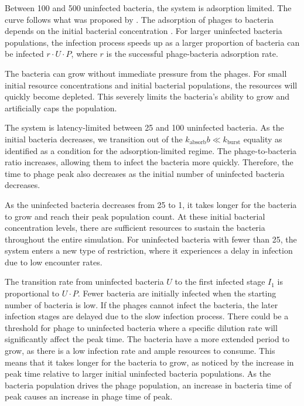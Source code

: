 Between 100 and 500 uninfected bacteria, the system is adsorption limited.
The curve follows what was proposed by \citet{mullaExtremeDiversityPhage2024}. 
The adsorption of phages to bacteria depends on the initial bacterial concentration \cite{mullaExtremeDiversityPhage2024}. 
For larger uninfected bacteria populations, the infection process speeds up as a larger proportion of bacteria can be infected $r\cdot U\cdot P$, where $r$ is the successful phage-bacteria adsorption rate. 

The bacteria can grow without immediate pressure from the phages. 
For small initial resource concentrations and initial bacterial populations, the resources will quickly become depleted. 
This severely limits the bacteria’s ability to grow and artificially caps the population. 

The system is latency-limited between 25 and 100 uninfected bacteria. 
As the initial bacteria decreases, we transition out of the $k_{\text{absorb}}b \ll k_{\text{burst}}$ equality as identified as a condition for the adsorption-limited regime. 
The phage-to-bacteria ratio increases, allowing them to infect the bacteria more quickly. 
Therefore, the time to phage peak also decreases as the initial number of uninfected bacteria decreases. 

As the uninfected bacteria decreases from 25 to 1, it takes longer for the bacteria to grow and reach their peak population count. 
At these initial bacterial concentration levels, there are sufficient resources to sustain the bacteria throughout the entire simulation. 
For uninfected bacteria with fewer than 25, the system enters a new type of restriction, where it experiences a delay in infection due to low encounter rates. 

The transition rate from uninfected bacteria $U$ to the first infected stage $I_1$ is proportional to $U\cdot P$. 
Fewer bacteria are initially infected when the starting number of bacteria is low. 
If the phages cannot infect the bacteria, the later infection stages are delayed due to the slow infection process. 
There could be a threshold for phage to uninfected bacteria where a specific dilution rate will significantly affect the peak time. 
The bacteria have a more extended period to grow, as there is a low infection rate and ample resources to consume. 
This means that it takes longer for the bacteria to grow, as noticed by the increase in peak time relative to larger initial uninfected bacteria populations. 
As the bacteria population drives the phage population, an increase in bacteria time of peak causes an increase in phage time of peak. 


